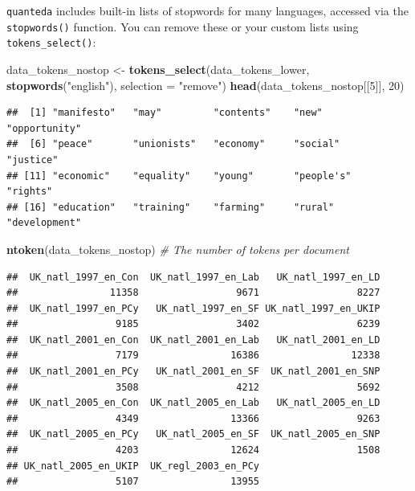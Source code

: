 \documentclass[
]{book}
\newenvironment{Shaded}{\begin{snugshade}}{\end{snugshade}}
\newcommand{\AttributeTok}[1]{\textcolor[rgb]{0.13,0.29,0.53}{#1}}
\newcommand{\CommentTok}[1]{\textcolor[rgb]{0.56,0.35,0.01}{\textit{#1}}}
\newcommand{\DecValTok}[1]{\textcolor[rgb]{0.00,0.00,0.81}{#1}}
\newcommand{\FunctionTok}[1]{\textcolor[rgb]{0.13,0.29,0.53}{\textbf{#1}}}
\newcommand{\NormalTok}[1]{#1}
\newcommand{\OtherTok}[1]{\textcolor[rgb]{0.56,0.35,0.01}{#1}}
\newcommand{\StringTok}[1]{\textcolor[rgb]{0.31,0.60,0.02}{#1}}
\begin{document}
\texttt{quanteda} includes built-in lists of stopwords for many languages, accessed via the \texttt{stopwords()} function. You can remove these or your custom lists using \texttt{tokens\_select()}:

\begin{Shaded}
\begin{Highlighting}[]
\NormalTok{data\_tokens\_nostop }\OtherTok{\textless{}{-}} \FunctionTok{tokens\_select}\NormalTok{(data\_tokens\_lower, }\FunctionTok{stopwords}\NormalTok{(}\StringTok{"english"}\NormalTok{), }\AttributeTok{selection =} \StringTok{"remove"}\NormalTok{)}
\FunctionTok{head}\NormalTok{(data\_tokens\_nostop[[}\DecValTok{5}\NormalTok{]], }\DecValTok{20}\NormalTok{)}
\end{Highlighting}
\end{Shaded}

\begin{verbatim}
##  [1] "manifesto"   "may"         "contents"    "new"         "opportunity"
##  [6] "peace"       "unionists"   "economy"     "social"      "justice"    
## [11] "economic"    "equality"    "young"       "people's"    "rights"     
## [16] "education"   "training"    "farming"     "rural"       "development"
\end{verbatim}

\begin{Shaded}
\begin{Highlighting}[]
\FunctionTok{ntoken}\NormalTok{(data\_tokens\_nostop)  }\CommentTok{\# The number of tokens per document}
\end{Highlighting}
\end{Shaded}

\begin{verbatim}
##  UK_natl_1997_en_Con  UK_natl_1997_en_Lab   UK_natl_1997_en_LD 
##                11358                 9671                 8227 
##  UK_natl_1997_en_PCy   UK_natl_1997_en_SF UK_natl_1997_en_UKIP 
##                 9185                 3402                 6239 
##  UK_natl_2001_en_Con  UK_natl_2001_en_Lab   UK_natl_2001_en_LD 
##                 7179                16386                12338 
##  UK_natl_2001_en_PCy   UK_natl_2001_en_SF  UK_natl_2001_en_SNP 
##                 3508                 4212                 5692 
##  UK_natl_2005_en_Con  UK_natl_2005_en_Lab   UK_natl_2005_en_LD 
##                 4349                13366                 9263 
##  UK_natl_2005_en_PCy   UK_natl_2005_en_SF  UK_natl_2005_en_SNP 
##                 4203                12624                 1508 
## UK_natl_2005_en_UKIP  UK_regl_2003_en_PCy 
##                 5107                13955
\end{verbatim}
\end{document}
